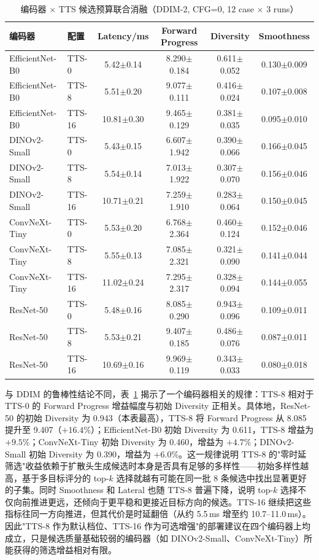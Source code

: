\begin{table}[htbp]
    \centering
    \small
    \caption{编码器 $\times$ TTS 候选预算联合消融（DDIM-2, CFG=0, 12 case $\times$ 3 runs）}
    \label{tab:encoder-tts-joint}
    \begin{tabular}{llcccc}
        \toprule
        编码器 & 配置 & Latency/ms & Forward Progress & Diversity & Smoothness \\
        \midrule
        EfficientNet-B0 & TTS-0 & 5.42$\pm$0.14 & 8.290$\pm$0.184 & 0.611$\pm$0.052 & 0.130$\pm$0.009 \\
        EfficientNet-B0 & TTS-8 & 5.51$\pm$0.20 & 9.077$\pm$0.111 & 0.416$\pm$0.024 & 0.107$\pm$0.008 \\
        EfficientNet-B0 & TTS-16 & 10.81$\pm$0.30 & 9.465$\pm$0.129 & 0.381$\pm$0.035 & 0.095$\pm$0.010 \\
        DINOv2-Small & TTS-0 & 5.43$\pm$0.15 & 6.607$\pm$1.942 & 0.390$\pm$0.066 & 0.166$\pm$0.045 \\
        DINOv2-Small & TTS-8 & 5.54$\pm$0.14 & 7.013$\pm$1.922 & 0.307$\pm$0.070 & 0.156$\pm$0.046 \\
        DINOv2-Small & TTS-16 & 10.71$\pm$0.21 & 7.259$\pm$1.910 & 0.283$\pm$0.064 & 0.150$\pm$0.045 \\
        ConvNeXt-Tiny & TTS-0 & 5.53$\pm$0.20 & 6.768$\pm$2.364 & 0.460$\pm$0.124 & 0.152$\pm$0.046 \\
        ConvNeXt-Tiny & TTS-8 & 5.55$\pm$0.13 & 7.085$\pm$2.321 & 0.321$\pm$0.090 & 0.141$\pm$0.044 \\
        ConvNeXt-Tiny & TTS-16 & 11.02$\pm$0.24 & 7.295$\pm$2.317 & 0.328$\pm$0.094 & 0.144$\pm$0.055 \\
        ResNet-50 & TTS-0 & 5.48$\pm$0.16 & 8.085$\pm$0.290 & 0.943$\pm$0.096 & 0.109$\pm$0.011 \\
        ResNet-50 & TTS-8 & 5.53$\pm$0.21 & 9.407$\pm$0.185 & 0.486$\pm$0.076 & 0.087$\pm$0.011 \\
        ResNet-50 & TTS-16 & 10.69$\pm$0.16 & 9.969$\pm$0.119 & 0.343$\pm$0.033 & 0.080$\pm$0.018 \\
        \bottomrule
    \end{tabular}
\end{table}

与 DDIM 的鲁棒性结论不同，表~\ref{tab:encoder-tts-joint} 揭示了一个编码器相关的规律：TTS-8 相对于 TTS-0 的 Forward Progress 增益幅度与初始 Diversity 正相关。具体地，ResNet-50 的初始 Diversity 为 0.943（本表最高），TTS-8 将 Forward Progress 从 8.085 提升至 9.407（$+16.4\%$）；EfficientNet-B0 初始 Diversity 为 0.611，TTS-8 增益为 $+9.5\%$；ConvNeXt-Tiny 初始 Diversity 为 0.460，增益为 $+4.7\%$；DINOv2-Small 初始 Diversity 为 0.390，增益为 $+6.0\%$。这一规律说明 TTS-8 的"零时延筛选"收益依赖于扩散头生成候选时本身是否具有足够的多样性——初始多样性越高，基于多目标评分的 top-$k$ 选择就越有可能在同一批 8 条候选中找出显著更好的子集。同时 Smoothness 和 Lateral 也随 TTS-8 普遍下降，说明 top-$k$ 选择不仅向前推进更远，还倾向于更平稳和更接近目标方向的候选。TTS-16 继续把这些指标往同一方向推进，但其代价是时延翻倍（从约 5.5\,ms 增至约 10.7--11.0\,ms）。因此"TTS-8 作为默认档位、TTS-16 作为可选增强"的部署建议在四个编码器上均成立，只是候选质量基础较弱的编码器（如 DINOv2-Small、ConvNeXt-Tiny）所能获得的筛选增益相对有限。

